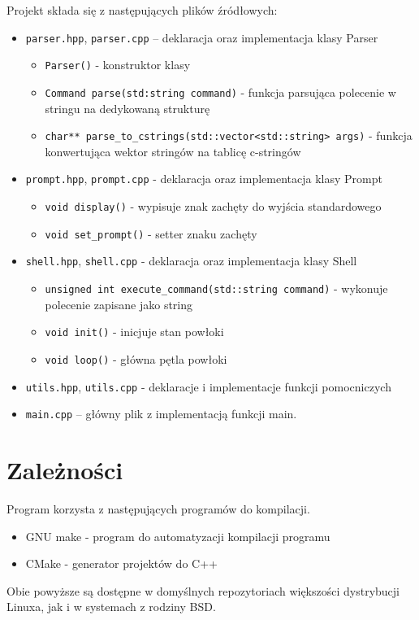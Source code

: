 \documentclass{article}
\begin{document}
Projekt składa się z następujących plików źródłowych:
    \begin{itemize}
    \item \texttt{parser.hpp}, \texttt{parser.cpp} – deklaracja oraz implementacja klasy Parser
        \begin{itemize}
            \item \texttt{Parser()} - konstruktor klasy
            \item \texttt{Command parse(std:string command)} - funkcja parsująca polecenie w stringu na dedykowaną strukturę
            \item \texttt{char** parse\_to\_cstrings(std::vector<std::string> args)} - funkcja konwertująca wektor stringów na
            tablicę c-stringów
        \end{itemize}
    \item \texttt{prompt.hpp}, \texttt{prompt.cpp} - deklaracja oraz implementacja klasy Prompt
        \begin{itemize}
            \item \texttt{void display()} - wypisuje znak zachęty do wyjścia standardowego
            \item \texttt{void set\_prompt()} - setter znaku zachęty
        \end{itemize}
    \item \texttt{shell.hpp}, \texttt{shell.cpp} - deklaracja oraz implementacja klasy Shell
        \begin{itemize}
            \item \texttt{unsigned int execute\_command(std::string command)} - wykonuje polecenie zapisane jako string
            \item \texttt{void init()} - inicjuje stan powłoki
            \item \texttt{void loop()} - główna pętla powłoki
        \end{itemize}
    \item \texttt{utils.hpp}, \texttt{utils.cpp} - deklaracje i implementacje funkcji pomocniczych
    \item \texttt{main.cpp} – główny plik z implementacją funkcji main.
    \end{itemize}

\section{Zależności}
Program korzysta z następujących programów do kompilacji.
\begin{itemize}
    \item GNU make - program do automatyzacji kompilacji programu
    \item CMake - generator projektów do C++
\end{itemize}
Obie powyższe są dostępne w domyślnych repozytoriach większości dystrybucji Linuxa, jak i w systemach z rodziny BSD.
\end{document}
